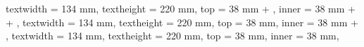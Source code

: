 
\ifprintVersion
    \ifprofessionalPrint
        \newgeometry
        {
            textwidth = 134 mm,
            textheight = 220 mm,
            top = 38 mm + \extraborderlength,
            inner = 38 mm + \mybindingcorrection + \extraborderlength,
        }
    \else
        \newgeometry
        {
            textwidth = 134 mm,
            textheight = 220 mm,
            top = 38 mm,
            inner = 38 mm + \mybindingcorrection,
        }
    \fi
\else
    \newgeometry
    {
        textwidth = 134 mm,
        textheight = 220 mm,
        top = 38 mm,
        inner = 38 mm,
    }
\fi

